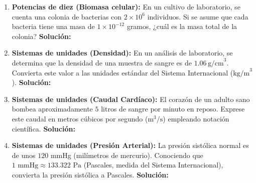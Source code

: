 \documentclass[12pt,letterpaper]{article}
\begin{document}
\begin{enumerate}
    \item \textbf{Potencias de diez (Biomasa celular):} En un cultivo de laboratorio, se cuenta una colonia de bacterias con $2 \times 10^6$ individuos. Si se asume que cada bacteria tiene una masa de $1 \times 10^{-12}$ gramos, ¿cuál es la masa total de la colonia?
    \textbf{Solución:} \\

    \item \textbf{Sistemas de unidades (Densidad):} En un análisis de laboratorio, se determina que la densidad de una muestra de sangre es de $1.06 \, \text{g/cm}^3$. Convierta este valor a las unidades estándar del Sistema Internacional ($\text{kg/m}^3$).
    \textbf{Solución:} \\

    
    \item \textbf{Sistemas de unidades (Caudal Cardíaco):} El corazón de un adulto sano bombea aproximadamente $5$ litros de sangre por minuto en reposo. Exprese este caudal en metros cúbicos por segundo ($\text{m}^3\text{/s}$) empleando notación científica.
    \textbf{Solución:} \\

    \item \textbf{Sistemas de unidades (Presión Arterial):} La presión sistólica normal es de unos $120$ mmHg (milímetros de mercurio). Conociendo que $1 \text{ mmHg} \approx 133.322 \text{ Pa}$ (Pascales, medida del Sistema Internacional), convierta la presión sistólica a Pascales.
    \textbf{Solución:} \\

\end{enumerate}
\end{document}
